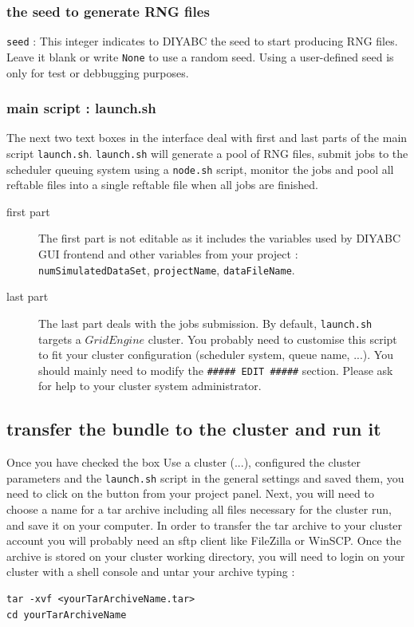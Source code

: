 \subsubsection{the seed to generate RNG files}
\texttt{seed} : This integer indicates to DIYABC the seed to start producing RNG files. Leave it blank or write \texttt{None} to use a random seed. Using a user-defined seed is only for test or debbugging purposes. 

\subsubsection{main script : launch.sh}
The next two text boxes in the interface deal with first and last parts of the main script \texttt{launch.sh}. \texttt{launch.sh} will generate a pool of RNG files, submit jobs to the scheduler queuing system using a \texttt{node.sh} script, monitor the jobs and pool all reftable files into a single reftable file when all jobs are finished.

\begin{description}
	\item[first part] The first part is not editable as it includes the variables used by DIYABC GUI frontend and other variables from your project : \texttt{numSimulatedDataSet}, \texttt{projectName}, \texttt{dataFileName}. 
	
	\item[last part] The last part deals with the jobs submission. By default, \texttt{launch.sh} targets a $Grid Engine$ cluster. You probably need to customise this script to fit your cluster configuration (scheduler system, queue name, ...). You should mainly need to modify the  \texttt{\#\#\#\#\# EDIT \#\#\#\#\#} section. Please ask for help to your cluster system administrator.
\end{description}

\subsection{transfer the bundle to the cluster and run it}\label{clusterrun}
Once you have checked the box \textsf{Use a cluster (...)}, configured the cluster parameters and the \texttt{launch.sh} script in the general settings and saved them, you need to click on the  button from your project panel. Next, you will need to choose a name for a tar archive including all files necessary for the cluster run, and save it on your computer. In order to transfer the tar archive to your cluster account you will probably need an sftp client like FileZilla or WinSCP. Once the archive is stored on your cluster working directory, you will need to login on your cluster with a shell console and untar your archive typing :\\
   \begin{minipage}{0.9\textwidth}
\begin{lstlisting}
tar -xvf <yourTarArchiveName.tar>
cd yourTarArchiveName

\end{lstlisting}
   \end{minipage}

